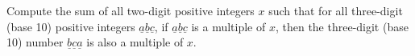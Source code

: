 Compute the sum of all two-digit positive integers $x$ such that for all three-digit (base 10) positive integers $\underline{a} \underline{b} \underline{c}$, if $\underline{a} \underline{b} \underline{c}$ is a multiple of $x$, then the three-digit (base 10) number $\underline{b} \underline{c} \underline{a}$ is also a multiple of $x$.